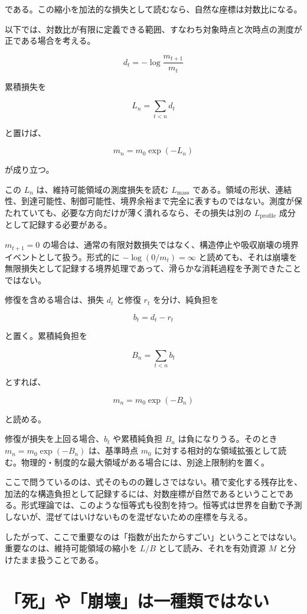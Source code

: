 \documentclass[12pt,a4paper]{article}
\begin{document}
である。この縮小を加法的な損失として読むなら、自然な座標は対数比になる。

以下では、対数比が有限に定義できる範囲、すなわち対象時点と次時点の測度が正である場合を考える。

\[
d_t=-\log\frac{m_{t+1}}{m_t}
\]

累積損失を

\[
L_n=\sum_{t<n}d_t
\]

と置けば、

\[
m_n=m_0\exp(-L_n)
\]

が成り立つ。

この \(L_n\) は、維持可能領域の測度損失を読む \(L_{\mathrm{mass}}\) である。領域の形状、連結性、到達可能性、制御可能性、境界余裕まで完全に表すものではない。測度が保たれていても、必要な方向だけが薄く潰れるなら、その損失は別の \(L_{\mathrm{profile}}\) 成分として記録する必要がある。

\(m_{t+1}=0\) の場合は、通常の有限対数損失ではなく、構造停止や吸収崩壊の境界イベントとして扱う。形式的に \(-\log(0/m_t)=\infty\) と読めても、それは崩壊を無限損失として記録する境界処理であって、滑らかな消耗過程を予測できたことではない。

修復を含める場合は、損失 \(d_t\) と修復 \(r_t\) を分け、純負担を

\[
b_t=d_t-r_t
\]

と置く。累積純負担を

\[
B_n=\sum_{t<n}b_t
\]

とすれば、

\[
m_n=m_0\exp(-B_n)
\]

と読める。

修復が損失を上回る場合、\(b_t\) や累積純負担 \(B_n\) は負になりうる。そのとき \(m_n=m_0\exp(-B_n)\) は、基準時点 \(m_0\) に対する相対的な領域拡張として読む。物理的・制度的な最大領域がある場合には、別途上限制約を置く。

ここで問うているのは、式そのものの難しさではない。積で変化する残存比を、加法的な構造負担として記録するには、対数座標が自然であるということである。形式理論では、このような恒等式も役割を持つ。恒等式は世界を自動で予測しないが、混ぜてはいけないものを混ぜないための座標を与える。

したがって、ここで重要なのは「指数が出たからすごい」ということではない。重要なのは、維持可能領域の縮小を \(L/B\) として読み、それを有効資源 \(M\) と分けたまま扱うことである。

\section{「死」や「崩壊」は一種類ではない}\label{ux6b7bux3084ux5d29ux58caux306fux4e00ux7a2eux985eux3067ux306fux306aux3044}
\end{document}
